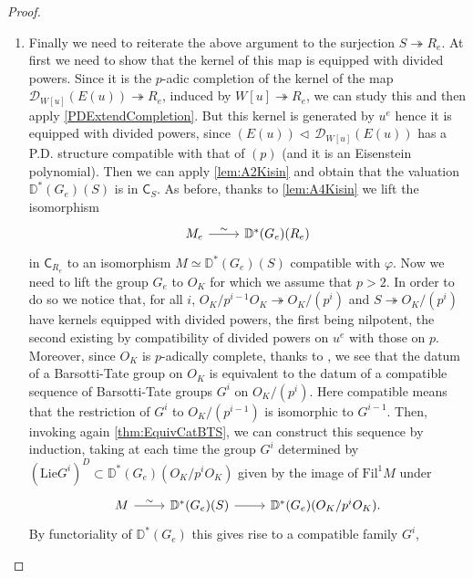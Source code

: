 \begin{proof}
\begin{enumerate}
\item Finally we need to reiterate the above argument to the surjection
	$S \twoheadrightarrow R_e$.
	At first we need to show that the kernel of this map is equipped with divided powers.
	Since it is the $p$-adic completion of the kernel
	of the map $\mathcal{D}_{W[u]}(E(u)) \twoheadrightarrow R_e$,
	induced by $W[u] \twoheadrightarrow R_e$, we can study this and
	then apply \cref{PDExtendCompletion}.
	But this kernel is generated by $u^e$ hence it is equipped with divided powers,
	since $(E(u)) \triangleleft\, \mathcal{D}_{W[u]}(E(u))$ has a P.D. structure
	compatible with that of $(p)$ (and it is an Eisenstein polynomial).
	Then we can apply \cref{lem:A2Kisin} and obtain that the valuation
	$\mathbb{D}^*(G_e)(S)$ is in $\mathsf{C}_{S}$.
	As before, thanks to \cref{lem:A4Kisin} we lift the isomorphism 
	\begin{equation*}
	\begin{tikzcd}
		M_e \arrow[r, "\sim", rightarrow] &
		\mathbb{D}^*(G_e)(R_e)
	\end{tikzcd}
	\end{equation*}
	in $\mathsf{C}_{R_e}$ to an isomorphism $M \simeq \mathbb{D}^*(G_e)(S)$
	compatible with $\varphi$.
	Now we need to lift the group $G_e$ to $O_K$ for which we assume that $p > 2$.
	In order to do so we notice that, for all $i$,
	$O_K/p^{i-1}O_K \twoheadrightarrow O_K/ (p^i)$ and
	$S \twoheadrightarrow O_K/ (p^i)$ have kernels equipped with
	divided powers, the first being nilpotent, the second existing by compatibility
	of divided powers on $u^e$ with those on $p$.
	Moreover, since $O_K$ is $p$-adically complete, thanks to \cite[Lemma 2.4.4]{deJong},
	we see that the datum of a Barsotti-Tate group on $O_K$ is equivalent to
	the datum of a compatible sequence of Barsotti-Tate groups $G^i$ on $O_K/ (p^i)$.
	Here compatible means that the restriction of $G^i$ to $O_K/ (p^{i-1})$
	is isomorphic to $G^{i-1}$.
	Then, invoking again \cref{thm:EquivCatBTS}, we can construct this sequence by induction,
	taking at each time the group $G^i$ determined by $(\mathrm{Lie} G^i)^D \subset
	\mathbb{D}^*(G_e)(O_K/p^iO_K)$ given by the image of $\mathrm{Fil}^1 M$ under
	\begin{equation*}
	\begin{tikzcd}
		M \arrow[r, "\sim", rightarrow] &
		\mathbb{D}^*(G_e)(S) \arrow[r, "", rightarrow] &
		\mathbb{D}^*(G_e)(O_K/p^iO_K)
	.\end{tikzcd}
	\end{equation*}
	By functoriality of $\mathbb{D}^*(G_e)$ this gives rise to a compatible family $G^i$,

\end{enumerate}
\end{proof}
